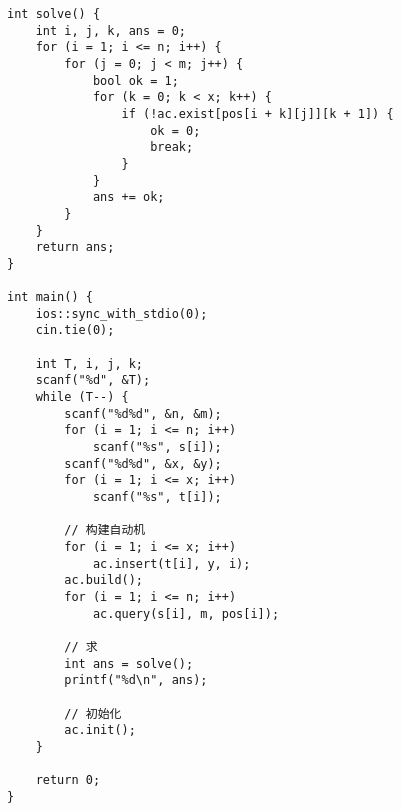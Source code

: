 \begin{lstlisting}
int solve() {
    int i, j, k, ans = 0;
    for (i = 1; i <= n; i++) {
        for (j = 0; j < m; j++) {
            bool ok = 1;
            for (k = 0; k < x; k++) {
                if (!ac.exist[pos[i + k][j]][k + 1]) {
                    ok = 0;
                    break;
                }
            }
            ans += ok;
        }
    }
    return ans;
}

int main() {
    ios::sync_with_stdio(0);
    cin.tie(0);

    int T, i, j, k;
    scanf("%d", &T);
    while (T--) {
        scanf("%d%d", &n, &m);
        for (i = 1; i <= n; i++)
            scanf("%s", s[i]);
        scanf("%d%d", &x, &y);
        for (i = 1; i <= x; i++)
            scanf("%s", t[i]);

        // 构建自动机
        for (i = 1; i <= x; i++)
            ac.insert(t[i], y, i);
        ac.build();
        for (i = 1; i <= n; i++)
            ac.query(s[i], m, pos[i]);

        // 求
        int ans = solve();
        printf("%d\n", ans);

        // 初始化
        ac.init();
    }

    return 0;
}
\end{lstlisting}